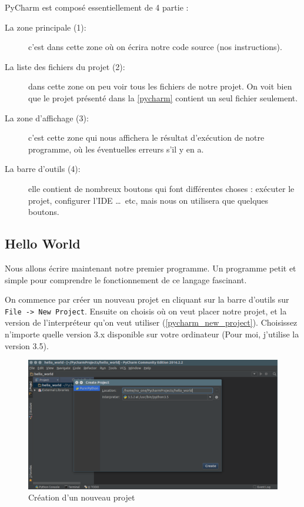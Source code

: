 \documentclass[12pt]{article}
\newcommand{\code}[1]{\colorbox{light-gray}{\texttt{#1}}}
\begin{document}
        PyCharm est composé essentiellement de 4 partie :
        \begin{description}
            \item[La zone principale (1):] c'est dans cette zone où on écrira notre code source (nos instructions).
            \item[La liste des fichiers du projet (2):] dans cette zone on peu voir tous les fichiers de notre projet. 
                On voit bien que le projet présenté dans la \autoref{pycharm} contient un seul fichier seulement.
            \item[La zone d'affichage (3):] c'est cette zone qui nous affichera le résultat d'exécution de notre 
                programme, où les éventuelles erreurs s'il y en a.
            \item[La barre d'outils (4):] elle contient de nombreux boutons qui font différentes choses : exécuter 
            le projet, configurer l'IDE \ldots\ etc, mais nous on utilisera que quelques boutons.
        \end{description}

\clearpage

    \subsection{Hello World}
        Nous allons écrire maintenant notre premier programme. Un programme petit et simple pour comprendre le 
        fonctionnement de ce langage fascinant.

        On commence par créer un nouveau projet en cliquant sur la barre d'outils sur \code{File -> New Project}. Ensuite on choisis où on veut placer notre projet, et la version de l'interpréteur qu'on veut utiliser
        (\autoref{pycharm_new_project}). Choisissez n'importe quelle version 3.x disponible sur votre ordinateur
        (Pour moi, j'utilise la version 3.5).

        \begin{figure}[H]
            \centering
            \includegraphics[width=\linewidth]{img/9_new_project.png}
            \caption{Création d'un nouveau projet}
            \label{pycharm_new_project}
        \end{figure}
\end{document}
